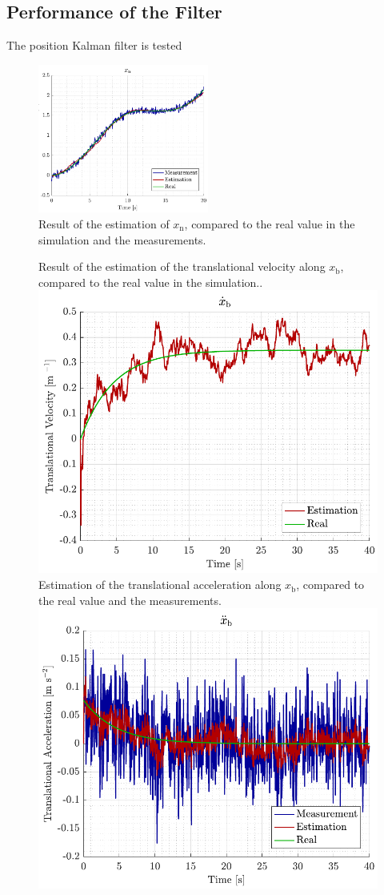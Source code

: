 \subsection{Performance of the Filter}
The position Kalman filter is tested 

\begin{figure}[H]
    \includegraphics[width=0.5\textwidth]{figures/sim_xn}
    \caption{Result of the estimation of $x_\mathrm{n}$, compared to the real value in the simulation and the measurements.}
    \label{fig:sim_xn}
\end{figure}


\begin{figure}[H]
    \captionbox 
    {   
        Result of the estimation of the translational velocity along $x_\mathrm{b}$, compared to the real value in the simulation..
        \label{fig:sim_xbdot}
    }                                                                 
    {                                                                  
        \includegraphics[width=.45\textwidth]{figures/sim_xbdot}         
    }                                                                    
    \hspace{5pt}                                                          
    \captionbox  
    {      
        Estimation of the translational acceleration along $x_\mathrm{b}$, compared to the real value and the measurements.
        \label{fig:sim_xbddot}
    }                                                                          
    {
        \includegraphics[width=.45\textwidth]{figures/sim_xbddot}
    }
\end{figure}